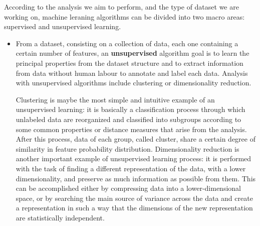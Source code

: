 \documentclass[11pt]{report}
\begin{document}
According to the analysis we aim to perform, and the type of dataset we are working on, machine leraning algorithms can be divided into two macro areas: supervised and unsupervised learning.
\begin{itemize}
\item From a dataset, consisting on a collection of data, each one containing a certain number of features, an \textbf{unsupervised} algorithm goal is to learn the principal properties from the dataset structure and to extract information from data without human labour to annotate and label each data.
Analysis with unsupervised algorithms include clustering or dimensionality reduction.

Clustering is maybe the most simple and intuitive example of an unsupervised learning: it is basically a classification process through which unlabeled data are reorganized and classified into subgroups according to some common properties or distance measures that arise from the analysis.
After this process, data of each group, called cluster, share a certain degree of similarity in feature probability distribution.
Dimensionality reduction is another important example of unsupervised learning process: it is performed with the task of finding a different representation of the data, with a lower dimensionality, and preserve as much information as possible from them.
This can be accomplished either by compressing data into a lower-dimensional space, or by searching the main source of variance across the data and create a representation in such a way that the dimensions of the new representation are statistically independent.





\end{itemize}
\end{document}
